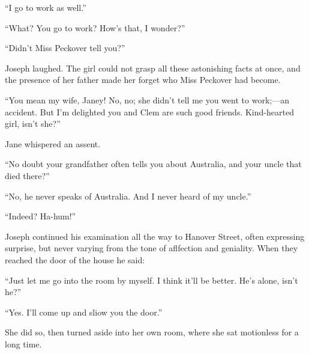 ``I go to work as well.''

``What? You go to work? How's that, I wonder?''

``Didn't Miss Peckover tell you?''

Joseph laughed. The girl could not grasp all these astonishing facts at
once, and the presence of her father made her forget who Miss Peckover
had become.

``You mean my wife, Janey! No, no; she didn't tell me you went to
work;---an accident. But I'm delighted you and Clem are such good
friends. Kind-hearted girl, isn't she?''

Jane whispered an assent.

``No doubt your grandfather often tells you about Australia, and your
uncle that died there?''

{}``No, he never speaks of Australia. And I never heard of my uncle.''

``Indeed? Ha-hum!''

Joseph continued his examination all the way to Hanover Street, often
expressing surprise, but never varying from the tone of aflfection and
geniality. When they reached the door of the house he said:

``Just let me go into the room by myself. I think it'll be better. He's
alone, isn't he?''

``Yes. I'll come up and sliow you the door.''

She did so, then turned aside into her own room, where she sat
motionless for a long time.
